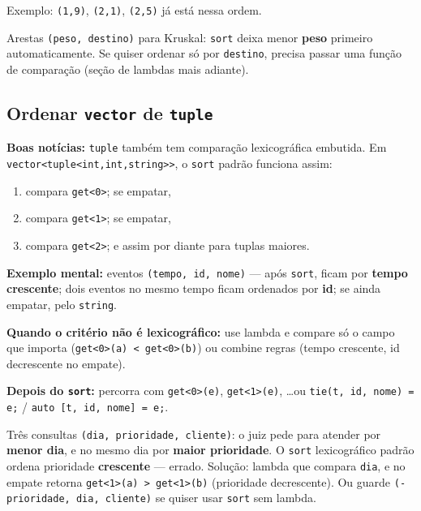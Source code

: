 Exemplo: \texttt{(1,9)}, \texttt{(2,1)}, \texttt{(2,5)} já está nessa ordem.

\begin{exemplodiabox}
Arestas \texttt{(peso, destino)} para Kruskal: \texttt{sort} deixa menor \textbf{peso} primeiro automaticamente. Se quiser ordenar só por \texttt{destino}, precisa passar uma função de comparação (seção de lambdas mais adiante).
\end{exemplodiabox}


\subsection{Ordenar \texttt{vector} de \texttt{tuple}}

\textbf{Boas notícias:} \texttt{tuple} também tem comparação lexicográfica embutida. Em
\texttt{vector<tuple<int,int,string>>}, o \texttt{sort} padrão funciona assim:

\begin{enumerate}[nosep]
  \item compara \texttt{get<0>}; se empatar,
  \item compara \texttt{get<1>}; se empatar,
  \item compara \texttt{get<2>}; e assim por diante para tuplas maiores.
\end{enumerate}

\textbf{Exemplo mental:} eventos \texttt{(tempo, id, nome)} --- após \texttt{sort}, ficam por \textbf{tempo crescente}; dois eventos no mesmo tempo ficam ordenados por \textbf{id}; se ainda empatar, pelo \texttt{string}.

\textbf{Quando o critério não é lexicográfico:} use lambda e compare só o campo que importa (\texttt{get<0>(a) < get<0>(b)}) ou combine regras (tempo crescente, id decrescente no empate).

\textbf{Depois do \texttt{sort}:} percorra com \texttt{get<0>(e)}, \texttt{get<1>(e)}, \ldots ou \texttt{tie(t, id, nome) = e;} / \texttt{auto [t, id, nome] = e;}.

\begin{exemplodiabox}
Três consultas \texttt{(dia, prioridade, cliente)}: o juiz pede para atender por \textbf{menor dia}, e no mesmo dia por \textbf{maior prioridade}. O \texttt{sort} lexicográfico padrão ordena prioridade \textbf{crescente} --- errado. Solução: lambda que compara \texttt{dia}, e no empate retorna \texttt{get<1>(a) > get<1>(b)} (prioridade decrescente). Ou guarde \texttt{(-prioridade, dia, cliente)} se quiser usar \texttt{sort} sem lambda.
\end{exemplodiabox}

